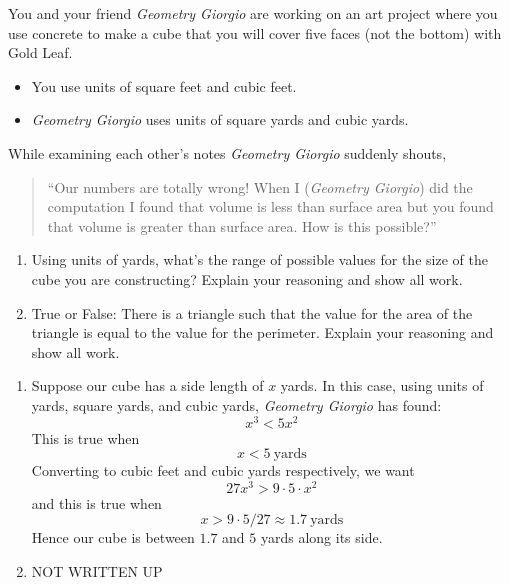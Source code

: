 \documentclass[handout,nooutcomes,noauthor]{ximera}
\begin{document}
\begin{question}
  You and your friend \textit{Geometry Giorgio} are working on an art
  project where you use concrete to make a cube that you will cover
  five faces (not the bottom) with Gold Leaf.
  \begin{itemize}
  \item You use units of square feet and cubic feet.
  \item \textit{Geometry Giorgio} uses units of square yards and cubic
    yards.
  \end{itemize}
  While examining each other's notes \textit{Geometry Giorgio}
  suddenly shouts,
  \begin{quote}
    ``Our numbers are totally wrong! When I (\textit{Geometry Giorgio})
    did the computation I found that volume is less than surface area
    but you found that volume is greater than surface area.  How is
    this possible?''
  \end{quote}
  \begin{enumerate}
  \item Using units of yards, what's the range of possible values
    for the size of the cube you are constructing? Explain your
    reasoning and show all work.
  \item True or False: There is a triangle such that the value for the
    area of the triangle is equal to the value for the
    perimeter. Explain your reasoning and show all work.
  \end{enumerate}
  \begin{freeResponse}
    \begin{enumerate}
    \item Suppose our cube has a side length of $x$ yards. In this
      case, using units of yards, square yards, and cubic yards,
      \textit{Geometry Giorgio} has found:
      \[
      x^3 < 5x^2
      \]
      This is true when
      \[
      x<5~\text{yards}
      \]
      Converting to cubic feet and cubic yards respectively, we want
      \[
      27x^3 > 9\cdot 5\cdot x^2
      \]
      and this is true when
      \[
      x > 9\cdot 5/27 \approx 1.7~\text{yards}
      \]
      Hence our cube is between $1.7$ and $5$ yards along its side.
    \item NOT WRITTEN UP
    \end{enumerate}
  \end{freeResponse}
\end{question}
\end{document}

